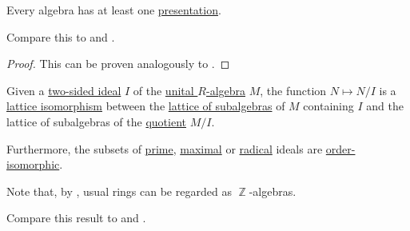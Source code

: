\begin{proposition}\label{thm:algebra_presentation_existence}
  Every algebra has at least one \hyperref[def:algebra_presentation]{presentation}.

  Compare this to  and .
\end{proposition}
\begin{proof}
  This can be proven analogously to .
\end{proof}

\begin{theorem}\label{thm:lattice_theorem_for_rings}
  Given a \hyperref[def:semiring_ideal]{two-sided ideal} \( I \) of the \hyperref[def:algebra_over_ring]{unital \( R \)-algebra} \( M \), the function \( N \mapsto N / I \) is a \hyperref[def:semilattice/homomorphism]{lattice isomorphism} between the \hyperref[thm:substructures_form_complete_lattice]{lattice of subalgebras} of \( M \) containing \( I \) and the lattice of subalgebras of the \hyperref[def:ring/quotient]{quotient} \( M / I \).

  Furthermore, the subsets of \hyperref[def:semiring_ideal/prime]{prime}, \hyperref[def:semiring_ideal/maximal]{maximal} or \hyperref[def:radical_ideal]{radical} ideals are \hyperref[def:order_homomorphism/isomorphism]{order-isomorphic}.

  Note that, by , usual rings can be regarded as \( \BbbZ \)-algebras.

  Compare this result to  and .
\end{theorem}
